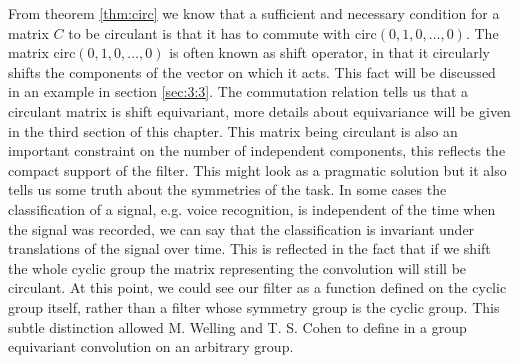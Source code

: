 \documentclass[../3.tex]{subfiles}
\begin{document}
    From theorem \ref{thm:circ} we know that a sufficient and necessary condition for a matrix $C$ to be circulant is that it has to commute
    with $\text{circ}(0,1,0,\dots,0)$.
    The matrix $\text{circ}(0,1,0,\dots,0)$ is often known as shift operator, in that it circularly shifts the components of the vector on which it acts.
    This fact will be discussed in an example in section \ref{sec:3:3}.
    The commutation relation tells us that a circulant matrix is shift equivariant, more details about equivariance will be given in the third section
    of this chapter. This matrix being circulant is also an important constraint on the number of independent components, this reflects the compact support of the filter.
    This might look as a pragmatic solution but it also tells us some truth about the symmetries of the task.
    In some cases the classification of a signal, e.g. voice recognition, is independent of the time when the signal was recorded,
    we can say that the classification is invariant under translations of the signal over time. This is reflected in the fact that if we 
    shift the whole cyclic group the matrix representing the convolution will still be circulant.
    At this point, we could see our filter as a function defined on the cyclic group itself, rather than a filter whose symmetry group is the cyclic group.
    This subtle distinction allowed M. Welling and T. S. Cohen to define in \cite{gcnn} a group equivariant convolution on an arbitrary group.
    
\end{document}
